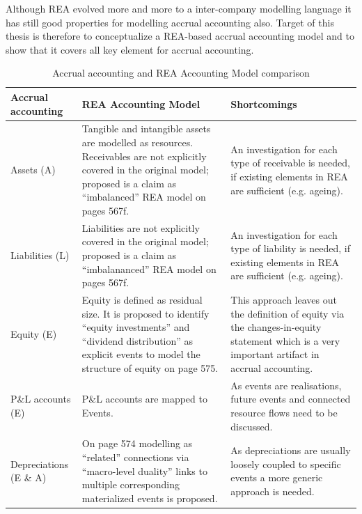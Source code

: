 Although REA evolved more and more to a inter-company modelling language it has still good properties for modelling accrual accounting also.
Target of this thesis is therefore to conceptualize a REA-based accrual accounting model and to show that it covers all key element for accrual accounting.
\begin{table}
	\caption{Accrual accounting and REA Accounting Model comparison}\label{tab:accrualaccounting}
\begin{center}
\begin{tabular}{|p{}|p{}|p{}|}
	\hline 
	Accrual accounting & REA Accounting Model \cite{mccarthy1982rea} & Shortcomings \\ 
	\hline 
	Assets (A) & Tangible and intangible assets are modelled as resources. Receivables are not explicitly covered in the original model; proposed is a claim as “imbalanced” REA model on pages 567f. %
	& An investigation for each type of receivable is needed, if existing elements in REA are sufficient (e.g. ageing). \\ 
	\hline 
	Liabilities (L) & Liabilities are not explicitly covered in the original model; proposed is a claim as “imbalananced” REA model on pages 567f. %
	& An investigation for each type of liability is needed, if existing elements in REA are sufficient (e.g. ageing). \\ 
	\hline 
	Equity (E) & %
	Equity is defined as residual size. It is proposed to identify “equity investments” and “dividend distribution” as explicit events to model the structure of equity on page 575. & This approach leaves out the definition of equity via the changes-in-equity statement which is a very important artifact in accrual accounting. \\
	\hline
	P\&L accounts (E) & %
	 P\&L accounts are mapped to Events. & As events are realisations, future events and connected resource flows need to be discussed. \\ 
	\hline 
	Depreciations (E \& A) & On page 574 modelling as “related” connections via “macro-level duality” links to multiple corresponding materialized events is proposed. & As depreciations are usually loosely coupled to specific events a more generic approach is needed. \\ 

\end{tabular}
\end{center}
\end{table}
